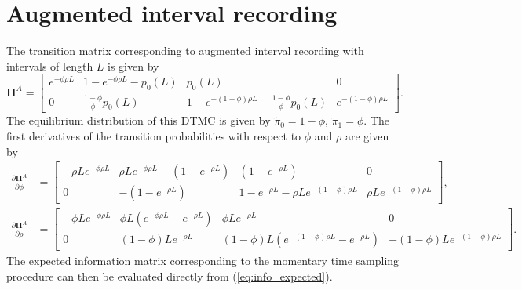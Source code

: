 \documentclass[11pt]{article}
\newcommand{\bs}{\boldsymbol}
\begin{document}
\section{Augmented interval recording}

The transition matrix corresponding to augmented interval recording with intervals of length $L$ is given by 
\begin{equation}
\bs\Pi^A = \left[\begin{array}{cccc} e^{-\phi \rho L} & 1 - e^{-\phi \rho L} - p_0(L) & p_0(L) & 0 \\ 0 & \frac{1 - \phi}{\phi}p_0(L) & 1 - e^{-(1 - \phi) \rho L} - \frac{1 - \phi}{\phi}p_0(L)& e^{-(1 - \phi) \rho L}  \end{array}\right].
\end{equation}
The equilibrium distribution of this DTMC is given by $\tilde{\pi}_0 = 1 - \phi$, $\tilde{\pi}_1 = \phi$. The first derivatives of the transition probabilities with respect to $\phi$ and $\rho$ are given by \begin{align*}
\frac{\partial \bs\Pi^A}{\partial \phi} &= \left[\begin{array}{cccc}
-\rho L e^{-\phi \rho L} & \rho L e^{-\phi \rho L} - (1 - e^{-\rho L}) & (1 - e^{-\rho L}) & 0 \\
0 & - (1 - e^{-\rho L})  &  1 - e^{-\rho L}  - \rho L e^{-(1 - \phi) \rho L} & \rho L e^{-(1 - \phi) \rho L}
\end{array}\right], \\
\frac{\partial \bs\Pi^A}{\partial \rho} &= \left[\begin{array}{cccc} 
-\phi L e^{-\phi \rho L} &\phi L \left( e^{-\phi \rho L} - e^{-\rho L}\right) & \phi L e^{-\rho L} & 0 \\ 
0 & (1 - \phi) L e^{-\rho L} & (1 - \phi) L \left(e^{-(1-\phi) \rho L} - e^{-\rho L}\right) & - (1 - \phi) L e^{- (1 - \phi) \rho L} 
\end{array}\right].
\end{align*}
The expected information matrix corresponding to the momentary time sampling procedure can then be evaluated directly from (\ref{eq:info_expected}). 
\end{document}
